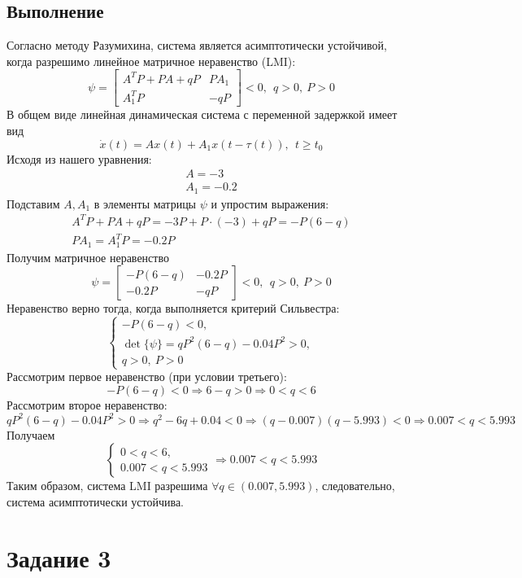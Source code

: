 \documentclass[a4paper, 12pt]{article}
\begin{document}
    \subsection{Выполнение}
    Согласно методу Разумихина, система является
    асимптотически устойчивой, когда разрешимо линейное матричное
    неравенство (LMI):
    $$
    \psi=
    \begin{bmatrix}
        A^TP+PA+qP & PA_1\\
        A^T_1P & -qP
    \end{bmatrix}<0,\ \ q>0,\ P>0
    $$
    В общем виде линейная динамическая система с переменной задержкой имеет вид
    $$
    \dot{x}(t)=Ax(t)+A_1x(t-\tau(t)),\ \ t\geq t_0
    $$
    Исходя из нашего уравнения:
    $$
    \begin{matrix}
        A=-3\\
        A_1=-0.2
    \end{matrix}
    $$
    Подставим $A,A_1$ в элементы матрицы $\psi$ и упростим выражения:
    $$
    \begin{matrix}
        A^TP+PA+qP=-3P+P\cdot(-3)+qP=-P(6-q)\\
        PA_1=A^T_1P=-0.2P
    \end{matrix}
    $$
    Получим матричное неравенство
    $$
    \psi=
    \begin{bmatrix}
        -P(6-q) & -0.2P\\
        -0.2P & -qP
    \end{bmatrix}<0,\ \ q>0,\ P>0
    $$
    Неравенство верно тогда, когда выполняется критерий Сильвестра:
    $$
    \begin{cases}
        -P(6-q)<0,\\
        \det{\{\psi\}}=qP^2(6-q)-0.04P^2>0,\\
        q>0,\ P>0
    \end{cases}
    $$
    Рассмотрим первое неравенство (при условии третьего):
    $$-P(6-q)<0\Rightarrow6-q>0\Rightarrow0<q<6$$
    Рассмотрим второе неравенство:
    $$qP^2(6-q)-0.04P^2>0\Rightarrow q^2-6q+0.04<0\Rightarrow(q-0.007)(q-5.993)<0\Rightarrow0.007<q<5.993$$
    Получаем
    $$
    \begin{cases}
        0<q<6,\\
        0.007<q<5.993
    \end{cases}
    \Rightarrow
    0.007<q<5.993
    $$
    Таким образом, система LMI разрешима $\forall q\in(0.007,5.993)$, следовательно, система
    асимптотически устойчива.


    \section{Задание 3}
\end{document}
